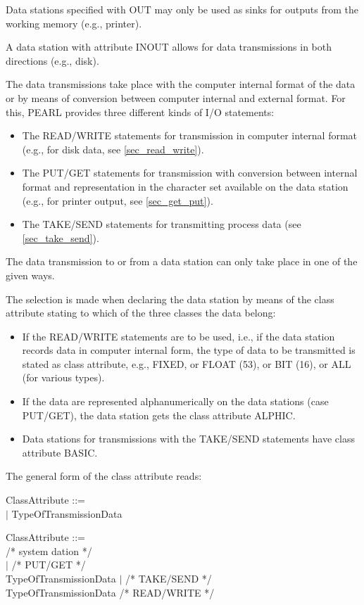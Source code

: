Data stations specified with OUT may only be used as sinks for outputs
from the working memory (e.g., printer).

A data station with attribute INOUT allows for data transmissions in
both directions (e.g., disk).

The data transmissions take place with the computer internal format of
the data or by means of conversion between computer internal and
external format. For this, PEARL provides three different kinds of I/O
statements:
\begin{itemize}
\item The READ/WRITE statements for transmission in computer internal
format (e.g., for disk data, see \ref{sec_read_write}).
\item The PUT/GET statements for transmission with conversion between
internal format and representation in the character set available on the
data station (e.g., for printer output, see \ref{sec_get_put}).
\item The TAKE/SEND statements for transmitting process data (see
\ref{sec_take_send}).
\end{itemize}

The data transmission to or from a data station can only take place in
one of the given ways.

The selection is made when declaring the data station by means of the
class attribute stating to which of the three classes the data belong:
\begin{itemize}
\item If the READ/WRITE statements are to be used, i.e., if the data
station records data in computer internal form, the type of data to be
transmitted is stated as class attribute, e.g., FIXED, or FLOAT (53),
or BIT (16), or ALL (for various types).
\item If the data are represented alphanumerically on the data stations
(case PUT/GET), the data station gets the class attribute ALPHIC.
\item Data stations for transmissions with the TAKE/SEND statements
have class attribute BASIC.
\end{itemize}

The general form of the class attribute reads:

\begin{removed}
ClassAttribute ::= \\
 $\mid$ TypeOfTransmissionData
\end{removed}
\begin{accepted}
ClassAttribute ::= \\
\x [ {\bf SYSTEM} ]  /* system dation */\\
\x {} $\mid$                  /* PUT/GET */ \\
\x {}  TypeOfTransmissionData $\mid$  /* TAKE/SEND */\\
\x \x  TypeOfTransmissionData               /* READ/WRITE */ \\
\end{accepted}

